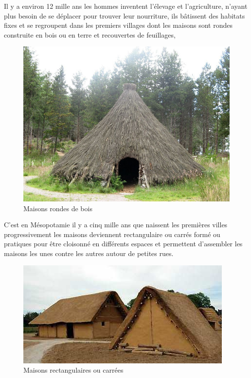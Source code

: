 Il y a environ 12 mille ans les hommes inventent l'élevage et l'agriculture, n'ayant plus besoin de se déplacer pour trouver leur nourriture, ils bâtissent des habitats fixes et se regroupent dans les premiers villages dont les maisons sont rondes construite en bois ou en terre et recouvertes de feuillages,
\begin{figure}[H]
    \centering
    \includegraphics[scale=1]{chap1/chap32.png}
   \caption{Maisons rondes de bois}
    \label{chap32}
\end{figure}

C’est en Mésopotamie il y a cinq mille ans que naissent les premières villes progressivement les maisons deviennent rectangulaire ou carrés formé ou pratiques pour être cloisonné en différents espaces et permettent d'assembler les maisons les unes contre les autres autour de petites rues. 
\begin{figure}[H]
    \centering
    \includegraphics[scale=1]{chap1/chap33.png}
   \caption{Maisons rectangulaires ou carrées}
    \label{chap33}
\end{figure}


